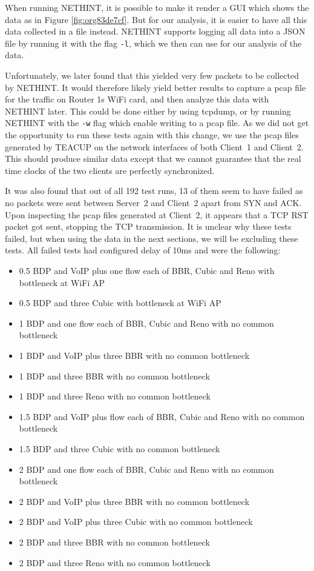 \documentclass[a4paper,11pt]{article}
\begin{document}
When running NETHINT, it is possible to make it render a GUI which shows the data as in Figure \ref{fig:org83de7cf}. But for our analysis, it is easier to have all this data collected in a file instead. NETHINT supports logging all data into a JSON file by running it with the flag \texttt{-l}, which we then can use for our analysis of the data.

Unfortunately, we later found that this yielded very few packets to be collected by NETHINT. It would therefore likely yield better results to capture a pcap file for the traffic on Router 1s WiFi card, and then analyze this data with NETHINT later. This could be done either by using tcpdump, or by running NETHINT with the \texttt{-w} flag which enable writing to a pcap file. As we did not get the opportunity to run these tests again with this change, we use the pcap files generated by TEACUP on the network interfaces of both Client~1 and Client~2. This should produce similar data except that we cannot guarantee that the real time clocks of the two clients are perfectly synchronized.

It was also found that out of all 192 test runs, 13 of them seem to have failed as no packets were sent between Server~2 and Client~2 apart from SYN and ACK. Upon inspecting the pcap files generated at Client~2, it appears that a TCP RST packet got sent, stopping the TCP transmission. It is unclear why these tests failed, but when using the data in the next sections, we will be excluding these tests. All failed tests had configured delay of 10ms and were the following:

\begin{itemize}
\item 0.5 BDP and VoIP plus one flow each of BBR, Cubic and Reno with bottleneck at WiFi AP
\item 0.5 BDP and three Cubic with bottleneck at WiFi AP
\item 1 BDP and one flow each of BBR, Cubic and Reno with no common bottleneck
\item 1 BDP and VoIP plus three BBR with no common bottleneck
\item 1 BDP and three BBR with no common bottleneck
\item 1 BDP and three Reno with no common bottleneck
\item 1.5 BDP and VoIP plus flow each of BBR, Cubic and Reno with no common bottleneck
\item 1.5 BDP and three Cubic with no common bottleneck
\item 2 BDP and one flow each of BBR, Cubic and Reno with no common bottleneck
\item 2 BDP and VoIP plus three BBR with no common bottleneck
\item 2 BDP and VoIP plus three Cubic with no common bottleneck
\item 2 BDP and three BBR with no common bottleneck
\item 2 BDP and three Reno with no common bottleneck
\end{itemize}
\end{document}
